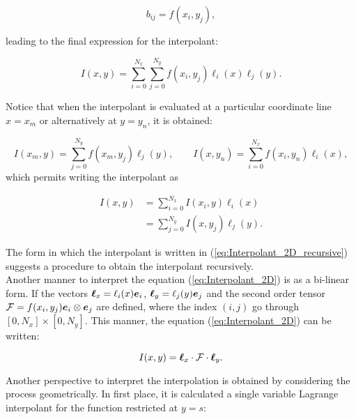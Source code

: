     \begin{equation}
    	b_{ij}  = f(x_i,y_j),
    \end{equation}
     
     leading to the final expression for the interpolant:
     
     \begin{equation}
     {I}(x,y) = \sum_{i=0}^{N_x} \sum_{j=0}^{N_y} f(x_i,y_j) \ell_i(x) \ell_j(y) .
     \end{equation}
     
     Notice that when the interpolant is evaluated at a particular coordinate line $x=x_m$ or alternatively at $y=y_n$, it is obtained:
     
     \begin{equation}
     	{I}(x_m,y) = \sum_{j=0}^{N_y} f(x_m,y_j)  \ell_j(y) , 
     	\qquad {I}(x,y_n) = \sum_{i=0}^{N_x}  f(x_i,y_n) \ell_i(x)  ,
     	\label{eq:Interpolant_2D}
     \end{equation}
     which permits writing the interpolant as
     
     \begin{align}
     	I(x,y) & = \sum_{i=0}^{N_x} {I}(x_i,y) \ell_i(x) \nonumber \\
     	       & = \sum_{j=0}^{N_y} {I}(x,y_j) \ell_j(y). \label{eq:Interpolant_2D_recursive}
     \end{align}
 
     The form in which the interpolant is written in (\ref{eq:Interpolant_2D_recursive}) suggests a procedure to obtain the interpolant recursively.\\
     
     Another manner to interpret the equation (\ref{eq:Interpolant_2D}) is  as a bi-linear form. If the vectors $\boldsymbol{\ell}_x = \ell_i(x) \boldsymbol{e}_i$, $\boldsymbol{\ell}_y = \ell_j(y) \boldsymbol{e}_j$ and the second order tensor $\mathcal{F} = f(x_i,y_j) \boldsymbol{e}_i  \otimes \boldsymbol{e}_j$ are defined, where the index $(i,j)$ go through $[0,N_x]\times[0,N_y]$. This manner, the equation (\ref{eq:Interpolant_2D}) can be written:
     
     \begin{equation}
     	I(x,y) =  \boldsymbol{\ell}_x \cdot \mathcal{F} \cdot \boldsymbol{\ell}_y .
     \end{equation}
     
     
     Another perspective to interpret the interpolation is obtained by considering the process geometrically. In first place, it is calculated a single variable Lagrange interpolant
     for the function restricted at $y=s$:
     
